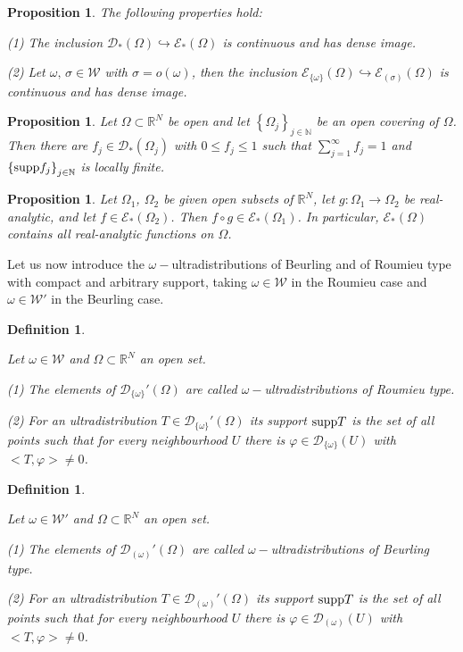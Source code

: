 \documentclass[twoside]{amsart}
\newtheorem{Def}[Th]{Definition}
\newtheorem{Prop}[Th]{Proposition}
\begin{document}
\begin{Prop}
  The following properties hold:
  
  (1) The inclusion ${\mathcal{D}}_*(\Omega)\hookrightarrow{\mathcal{E}}_*(\Omega)$ is continuous
and has dense image.

(2) Let $\omega,\,\sigma\in{\mathcal{W}}$ with $\sigma=o(\omega)$, then the
inclusion ${\mathcal{E}}_{\{\omega\}}(\Omega)\hookrightarrow{\mathcal{E}}_{(\sigma)}(\Omega)$
is continuous and has dense image.
\end{Prop}

\begin{Prop}
  Let $\Omega\subset{\mathbb R}^N$ be open and let
  $\left\{\Omega_{j}\right\}_{j\in{\mathbb N}}$ be an open covering of $\Omega$.
Then there are $f_{j}\in{\mathcal{D}}_*(\Omega_{j})$ with $0\leq f_{j}\leq1$
such that $\sum_{j=1}^{\infty}f_{j}=1$ and $\left\{{\mathop{\rm supp}\nolimits} f_{j}\right\}_{j\in{\mathbb N}}$
is locally finite.
\end{Prop}

\begin{Prop}
Let $\Omega_{1}$, $\Omega_{2}$ be given open subsets of ${\mathbb R}^N$, let 
$g:\Omega_{1}\rightarrow\Omega_{2}$
be real-analytic, and let $f\in{\mathcal{E}}_*(\Omega_{2})$. Then 
$f\circ g\in{\mathcal{E}}_*(\Omega_{1})$.
In particular, ${\mathcal{E}}_*(\Omega)$ contains all real-analytic functions
on $\Omega$.
\end{Prop}

Let us now introduce the $\omega-$ultradistributions of Beurling
and of Roumieu type with compact and arbitrary support, taking
$\omega\in{\mathcal{W}}$ in the Roumieu case and $\omega\in{\mathcal{W}}'$ in the Beurling case.

\begin{Def}
\begin{em}
Let $\omega\in{\mathcal{W}}$
and $\Omega\subset{\mathbb R}^N$ an open set.

(1) The elements of ${\mathcal{D}}_{\{\omega\}}'(\Omega)$ are called 
\emph{$\omega-$ultradistributions
of Roumieu type}.

(2) For an ultradistribution $T\in{\mathcal{D}}_{\{\omega\}}'(\Omega)$ its support 
${\mathop{\rm supp}\nolimits} T$
is the set of all points such that for every neighbourhood $U$ there
is $\varphi\in{\mathcal{D}}_{\{\omega\}}(U)$ with $<T,\varphi>\not=0$.
\end{em}
\end{Def}

\begin{Def}
\begin{em}
Let $\omega\in{\mathcal{W}}'$
and $\Omega\subset{\mathbb R}^N$ an open set.

(1) The elements of ${\mathcal{D}}_{(\omega)}'(\Omega)$ are called 
\emph{$\omega-$ultradistributions
of Beurling type.}

(2) For an ultradistribution $T\in{\mathcal{D}}_{(\omega)}'(\Omega)$ its support 
${\mathop{\rm supp}\nolimits} T$
is the set of all points such that for every neighbourhood $U$ there
is $\varphi\in{\mathcal{D}}_{(\omega)}(U)$ with $<T,\varphi>\not=0$.
\end{em}
\end{Def}
\end{document}
